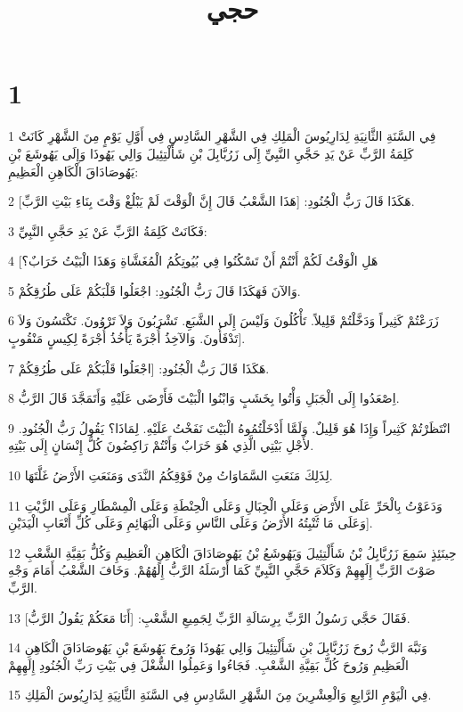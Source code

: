 

\title{حجي}


\chapter{1}

\par 1 فِي السَّنَةِ الثَّانِيَةِ لِدَارِيُوسَ الْمَلِكِ فِي الشَّهْرِ السَّادِسِ فِي أَوَّلِ يَوْمٍ مِنَ الشَّهْرِ كَانَتْ كَلِمَةُ الرَّبِّ عَنْ يَدِ حَجَّيِ النَّبِيِّ إِلَى زَرُبَّابِلَ بْنِ شَأَلْتِئِيلَ وَالِي يَهُوذَا وَإِلَى يَهُوشَعَ بْنِ يَهُوصَادَاقَ الْكَاهِنِ الْعَظِيمِ:
\par 2 هَكَذَا قَالَ رَبُّ الْجُنُودِ: [هَذَا الشَّعْبُ قَالَ إِنَّ الْوَقْتَ لَمْ يَبْلُغْ وَقْتَ بِنَاءِ بَيْتِ الرَّبِّ].
\par 3 فَكَانَتْ كَلِمَةُ الرَّبِّ عَنْ يَدِ حَجَّيِ النَّبِيِّ:
\par 4 [هَلِ الْوَقْتُ لَكُمْ أَنْتُمْ أَنْ تَسْكُنُوا فِي بُيُوتِكُمُ الْمُغَشَّاةِ وَهَذَا الْبَيْتُ خَرَابٌ؟
\par 5 وَالآنَ فَهَكَذَا قَالَ رَبُّ الْجُنُودِ: اجْعَلُوا قَلْبَكُمْ عَلَى طُرُقِكُمْ.
\par 6 زَرَعْتُمْ كَثِيراً وَدَخَّلْتُمْ قَلِيلاً. تَأْكُلُونَ وَلَيْسَ إِلَى الشَّبَعِ. تَشْرَبُونَ وَلاَ تَرْوُونَ. تَكْتَسُونَ وَلاَ تَدْفَأُونَ. وَالآخِذُ أُجْرَةً يَأْخُذُ أُجْرَةً لِكِيسٍ مَنْقُوبٍ].
\par 7 هَكَذَا قَالَ رَبُّ الْجُنُودِ: [اجْعَلُوا قَلْبَكُمْ عَلَى طُرُقِكُمْ.
\par 8 اِصْعَدُوا إِلَى الْجَبَلِ وَأْتُوا بِخَشَبٍ وَابْنُوا الْبَيْتَ فَأَرْضَى عَلَيْهِ وَأَتَمَجَّدَ قَالَ الرَّبُّ.
\par 9 انْتَظَرْتُمْ كَثِيراً وَإِذَا هُوَ قَلِيلٌ. وَلَمَّا أَدْخَلْتُمُوهُ الْبَيْتَ نَفَخْتُ عَلَيْهِ. لِمَاذَا؟ يَقُولُ رَبُّ الْجُنُودِ. لأَجْلِ بَيْتِي الَّذِي هُوَ خَرَابٌ وَأَنْتُمْ رَاكِضُونَ كُلُّ إِنْسَانٍ إِلَى بَيْتِهِ.
\par 10 لِذَلِكَ مَنَعَتِ السَّمَاوَاتُ مِنْ فَوْقِكُمُ النَّدَى وَمَنَعَتِ الأَرْضُ غَلَّتَهَا.
\par 11 وَدَعَوْتُ بِالْحَرِّ عَلَى الأَرْضِ وَعَلَى الْجِبَالِ وَعَلَى الْحِنْطَةِ وَعَلَى الْمِسْطَارِ وَعَلَى الزَّيْتِ وَعَلَى مَا تُنْبِتُهُ الأَرْضُ وَعَلَى النَّاسِ وَعَلَى الْبَهَائِمِ وَعَلَى كُلِّ أَتْعَابِ الْيَدَيْنِ].
\par 12 حِينَئِذٍ سَمِعَ زَرُبَّابِلُ بْنُ شَأَلْتِئِيلَ وَيَهُوشَعُ بْنُ يَهُوصَادَاقَ الْكَاهِنِ الْعَظِيمِ وَكُلُّ بَقِيَّةِ الشَّعْبِ صَوْتَ الرَّبِّ إِلَهِهِمْ وَكَلاَمَ حَجَّيِ النَّبِيِّ كَمَا أَرْسَلَهُ الرَّبُّ إِلَهُهُمْ. وَخَافَ الشَّعْبُ أَمَامَ وَجْهِ الرَّبِّ.
\par 13 فَقَالَ حَجَّي رَسُولُ الرَّبِّ بِرِسَالَةِ الرَّبِّ لِجَمِيعِ الشَّعْبِ: [أَنَا مَعَكُمْ يَقُولُ الرَّبُّ].
\par 14 وَنَبَّهَ الرَّبُّ رُوحَ زَرُبَّابِلَ بْنِ شَأَلْتِئِيلَ وَالِي يَهُوذَا وَرُوحَ يَهُوشَعَ بْنِ يَهُوصَادَاقَ الْكَاهِنِ الْعَظِيمِ وَرُوحَ كُلِّ بَقِيَّةِ الشَّعْبِ. فَجَاءُوا وَعَمِلُوا الشُّغْلَ فِي بَيْتِ رَبِّ الْجُنُودِ إِلَهِهِمْ
\par 15 فِي الْيَوْمِ الرَّابِعِ وَالْعِشْرِينَ مِنَ الشَّهْرِ السَّادِسِ فِي السَّنَةِ الثَّانِيَةِ لِدَارِيُوسَ الْمَلِكِ.

